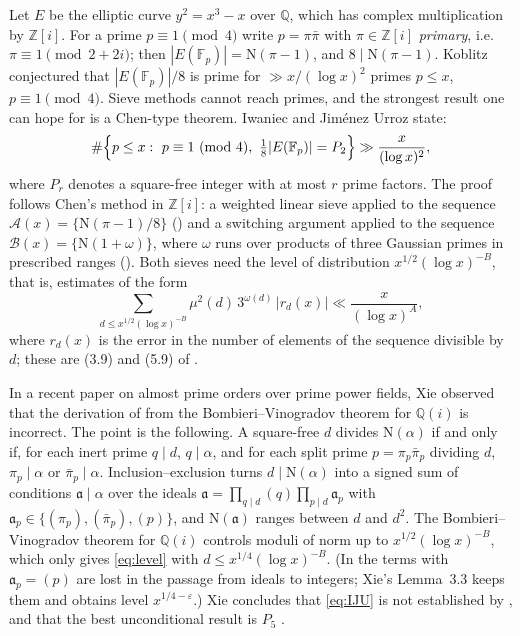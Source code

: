\documentclass[11pt]{amsart}
\theoremstyle{remark}
\newcommand{\Z}{\mathbb{Z}}
\newcommand{\Q}{\mathbb{Q}}
\newcommand{\F}{\mathbb{F}}
\newcommand{\N}{\mathrm{N}}
\newcommand{\fa}{\mathfrak{a}}
\newcommand{\e}{\varepsilon}
\begin{document}
Let $E$ be the elliptic curve $y^2=x^3-x$ over $\Q$, which has complex multiplication by $\Z[i]$. For a prime $p\equiv 1\pmod 4$ write $p=\pi\bar\pi$ with $\pi\in\Z[i]$ \emph{primary}, i.e.\ $\pi\equiv 1\pmod{2+2i}$; then $|E(\F_p)|=\N(\pi-1)$, and $8\mid \N(\pi-1)$. Koblitz \cite{Kob} conjectured that $|E(\F_p)|/8$ is prime for $\gg x/(\log x)^2$ primes $p\le x$, $p\equiv 1\pmod 4$. Sieve methods cannot reach primes, and the strongest result one can hope for is a Chen-type theorem. Iwaniec and Jim\'enez Urroz \cite[Theorem~1.2]{IJU} state:
\begin{equation}\label{eq:IJU}
\#\Bigl\{p\le x:\ p\equiv 1\ (\mathrm{mod}\ 4),\ \tfrac18|E(\F_p)| = P_2\Bigr\}\gg \frac{x}{(\log x)^2},
\end{equation}
where $P_r$ denotes a square-free integer with at most $r$ prime factors. The proof follows Chen's method in $\Z[i]$: a weighted linear sieve applied to the sequence $\mathcal A(x)=\{\N(\pi-1)/8\}$ (\cite[\S\S 3--4]{IJU}) and a switching argument applied to the sequence $\mathcal B(x)=\{\N(1+\omega)\}$, where $\omega$ runs over products of three Gaussian primes in prescribed ranges (\cite[\S 5]{IJU}). Both sieves need the level of distribution $x^{1/2}(\log x)^{-B}$, that is, estimates of the form
\begin{equation}\label{eq:level}
\sum_{d\le x^{1/2}(\log x)^{-B}}\mu^2(d)\,3^{\omega(d)}\,|r_d(x)|\ll \frac{x}{(\log x)^A},
\end{equation}
where $r_d(x)$ is the error in the number of elements of the sequence divisible by $d$; these are (3.9) and (5.9) of \cite{IJU}.

In a recent paper on almost prime orders over prime power fields, Xie \cite[Remark~4.1]{Xie} observed that the derivation of \cite[(3.9)]{IJU} from the Bombieri--Vinogradov theorem for $\Q(i)$ is incorrect. The point is the following. A square-free $d$ divides $\N(\alpha)$ if and only if, for each inert prime $q\mid d$, $q\mid\alpha$, and for each split prime $p=\pi_p\bar\pi_p$ dividing $d$, $\pi_p\mid\alpha$ or $\bar\pi_p\mid\alpha$. Inclusion--exclusion turns $d\mid \N(\alpha)$ into a signed sum of conditions $\fa\mid\alpha$ over the ideals $\fa=\prod_{q\mid d}(q)\prod_{p\mid d}\fa_p$ with $\fa_p\in\{(\pi_p),(\bar\pi_p),(p)\}$, and $\N(\fa)$ ranges between $d$ and $d^2$. The Bombieri--Vinogradov theorem for $\Q(i)$ controls moduli of norm up to $x^{1/2}(\log x)^{-B}$, which only gives \eqref{eq:level} with $d\le x^{1/4}(\log x)^{-B}$. (In \cite[p.~823]{IJU} the terms with $\fa_p=(p)$ are lost in the passage from ideals to integers; Xie's Lemma~3.3 keeps them and obtains level $x^{1/4-\e}$.) Xie concludes that \eqref{eq:IJU} is not established by \cite{IJU}, and that the best unconditional result is $P_5$ \cite{Coj, Xie}.
\end{document}
